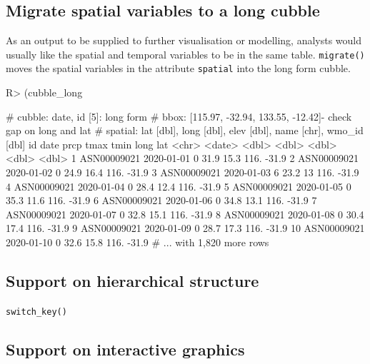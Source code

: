 \documentclass[
]{jss}
\begin{document}
\hypertarget{migrate-spatial-variables-to-a-long-cubble}{%
\subsection{Migrate spatial variables to a long
cubble}\label{migrate-spatial-variables-to-a-long-cubble}}

As an output to be supplied to further visualisation or modelling,
analysts would usually like the spatial and temporal variables to be in
the same table. \texttt{migrate()} moves the spatial variables in the
attribute \texttt{spatial} into the long form cubble.

\begin{CodeChunk}
\begin{CodeInput}
R> (cubble_long %
\end{CodeInput}
\begin{CodeOutput}
# cubble:  date, id [5]: long form
# bbox:    [115.97, -32.94, 133.55, -12.42]- check gap on long and lat
# spatial: lat [dbl], long [dbl], elev [dbl], name [chr], wmo_id [dbl]
   id          date        prcp  tmax  tmin  long   lat
   <chr>       <date>     <dbl> <dbl> <dbl> <dbl> <dbl>
 1 ASN00009021 2020-01-01     0  31.9  15.3  116. -31.9
 2 ASN00009021 2020-01-02     0  24.9  16.4  116. -31.9
 3 ASN00009021 2020-01-03     6  23.2  13    116. -31.9
 4 ASN00009021 2020-01-04     0  28.4  12.4  116. -31.9
 5 ASN00009021 2020-01-05     0  35.3  11.6  116. -31.9
 6 ASN00009021 2020-01-06     0  34.8  13.1  116. -31.9
 7 ASN00009021 2020-01-07     0  32.8  15.1  116. -31.9
 8 ASN00009021 2020-01-08     0  30.4  17.4  116. -31.9
 9 ASN00009021 2020-01-09     0  28.7  17.3  116. -31.9
10 ASN00009021 2020-01-10     0  32.6  15.8  116. -31.9
# ... with 1,820 more rows
\end{CodeOutput}
\end{CodeChunk}

\hypertarget{support-on-hierarchical-structure}{%
\subsection{Support on hierarchical
structure}\label{support-on-hierarchical-structure}}

\texttt{switch\_key()}

\hypertarget{support-on-interactive-graphics}{%
\subsection{Support on interactive
graphics}\label{support-on-interactive-graphics}}
\end{document}
